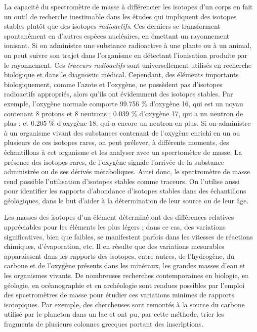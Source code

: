 \documentclass[../main.tex]{subfiles}
\begin{document}
\par La capacité du spectromètre de masse à différencier les isotopes d'un corps en fait un outil de recherche inestimable dans les études qui impliquent des isotopes stables plutôt que des isotopes \textit{radioactifs}. Ces derniers se transforment spontanément en d'autres espèces nucléaires, en émettant un rayonnement ionisant. Si on administre une substance radioactive  à une plante ou à un animal, on peut suivre son trajet dans l'organisme en détectant l'ionisation produite par le rayonnement. Ces \textit{traceurs radioactifs} sont universellement utilisés en recherche biologique et dans le diagnostic médical. Cependant, des éléments importants biologiquement, comme l'azote et l'oxygène, ne possèdent pas d'isotopes radioactifs appropriés, alors qu'ils ont évidemment des isotopes stables. Par exemple, l'oxygène normale comporte 99.756 \% d'oxygène 16, qui est un noyau contenant 8 protons et 8 neutrons ; 0.039 \% d'oxygène 17, qui a un neutron de plus ; et 0.205 \% d'oxygène 18, qui a encore un neutron en plus. Si on administre à un organisme vivant des substances contenant de l'oxygène enrichi en un ou plusieurs de ces isotopes rares, on peut prélever, à différents moments, des échantillons à cet organisme et les analyser avec un specrtomètre de masse. La présence des isotopes rares, de l'oxygène signale l'arrivée de la substance administrée ou de ses dérivés métaboliques. Ainsi donc, le spectromètre de masse rend possible l'utilisation d'isotopes stables comme traceurs. On l'utilise aussi pour identifier les rapports d'abondance d'isotopes stables dans des échantillons géologiques, dans le but d'aider à la détermination de leur source ou de leur âge.\\
\par Les masses des isotopes d'un élément déterminé ont des différences relatives appréciables pour les éléments les plus légers ; dans ce cas, des variations significatives, bien que faibles, se manifestent parfois dans les vitesses de réactions chimiques, d'évaporation, etc. Il en résulte que des variations mesurables apparaissent dans les rapports des isotopes, entre autres, de l'hydrogène, du carbone et de l'oxygène présents dans les minéraux, les grandes masses d'eau et les organismes vivants. De nombreuses recherches contemporaines en biologie, en géologie, en océanographie et en archéologie sont rendues possibles par l'emploi des spcetromètres de masse pour étudier ces variations minimes de rapports isotopiques. Par exemple, des chercheuses sont remontés à la source du carbone utilisé par le plancton dans un lac et ont pu, par cette méthode, trier les fragments de plusieurs colonnes grecques portant des inscriptions.\\
\end{document}

